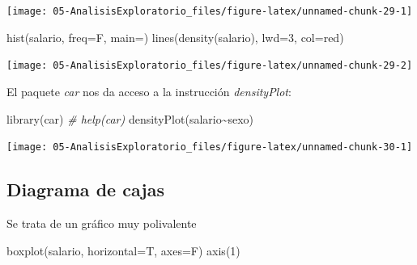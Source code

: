 \documentclass[
]{book}
\newenvironment{Shaded}{\begin{snugshade}}{\end{snugshade}}
\newcommand{\AttributeTok}[1]{\textcolor[rgb]{0.77,0.63,0.00}{#1}}
\newcommand{\CommentTok}[1]{\textcolor[rgb]{0.56,0.35,0.01}{\textit{#1}}}
\newcommand{\DecValTok}[1]{\textcolor[rgb]{0.00,0.00,0.81}{#1}}
\newcommand{\FunctionTok}[1]{\textcolor[rgb]{0.00,0.00,0.00}{#1}}
\newcommand{\NormalTok}[1]{#1}
\newcommand{\SpecialCharTok}[1]{\textcolor[rgb]{0.00,0.00,0.00}{#1}}
\newcommand{\StringTok}[1]{\textcolor[rgb]{0.31,0.60,0.02}{#1}}
\theoremstyle{break}
\begin{document}
\begin{center}\texttt{[image: 05-AnalisisExploratorio\_files/figure-latex/unnamed-chunk-29-1]} \end{center}

\begin{Shaded}
\begin{Highlighting}[]
\FunctionTok{hist}\NormalTok{(salario, }\AttributeTok{freq=}\NormalTok{F, }\AttributeTok{main=}\StringTok{\textquotesingle{}\textquotesingle{}}\NormalTok{)}
\FunctionTok{lines}\NormalTok{(}\FunctionTok{density}\NormalTok{(salario), }\AttributeTok{lwd=}\DecValTok{3}\NormalTok{, }\AttributeTok{col=}\StringTok{\textquotesingle{}red\textquotesingle{}}\NormalTok{)}
\end{Highlighting}
\end{Shaded}

\begin{center}\texttt{[image: 05-AnalisisExploratorio\_files/figure-latex/unnamed-chunk-29-2]} \end{center}

El paquete \emph{car} nos da acceso a la instrucción \emph{densityPlot}:

\begin{Shaded}
\begin{Highlighting}[]
\FunctionTok{library}\NormalTok{(car)  }\CommentTok{\# help(car)}
\FunctionTok{densityPlot}\NormalTok{(salario}\SpecialCharTok{\textasciitilde{}}\NormalTok{sexo)}
\end{Highlighting}
\end{Shaded}

\begin{center}\texttt{[image: 05-AnalisisExploratorio\_files/figure-latex/unnamed-chunk-30-1]} \end{center}

\hypertarget{diagrama-de-cajas}{%
\subsection{Diagrama de cajas}\label{diagrama-de-cajas}}

Se trata de un gráfico muy polivalente

\begin{Shaded}
\begin{Highlighting}[]
\FunctionTok{boxplot}\NormalTok{(salario, }\AttributeTok{horizontal=}\NormalTok{T, }\AttributeTok{axes=}\NormalTok{F)}
\FunctionTok{axis}\NormalTok{(}\DecValTok{1}\NormalTok{)}
\end{Highlighting}
\end{Shaded}
\end{document}
